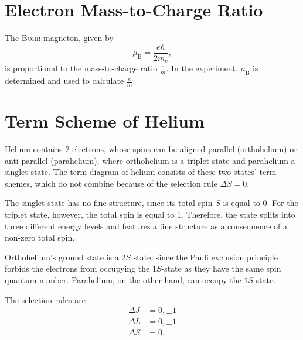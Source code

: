 \section{Electron Mass-to-Charge Ratio}
The \textsc{Bohr} magneton, given by
\begin{equation*}
\mu_\text{B} = \frac{e \hbar}{2 m_\text{e}},
\end{equation*}
is proportional to the mass-to-charge ratio $\frac{e}{m}$.
In the experiment, $\mu_\text{B}$ is determined and used to calculate $\frac{e}{m}$.

\section{Term Scheme of Helium}
Helium contains 2 electrons, whose spins can be aligned parallel (orthohelium) or anti-parallel (parahelium), where orthohelium is a triplet state and parahelium a singlet state.
The term diagram of helium consists of these two states' term shemes, which do not combine because of the selection rule $\Delta S = 0$.

The singlet state has no fine structure, since its total spin $S$ is equal to 0.
For the triplet state, however, the total spin is equal to 1.
Therefore, the state splits into three different energy levels and features a fine structure as a consequence of a non-zero total spin.

Orthohelium's ground state is a $2S$ state, since the Pauli exclusion principle forbids the electrons from occupying the $1S$-state as they have the same spin quantum number.
Parahelium, on the other hand, can occupy the $1S$-state.

The selection rules are
\begin{align*}
	\Delta J &= 0, \pm 1 \\
	\Delta L &= 0, \pm 1 \\
	\Delta S &= 0.
\end{align*}
